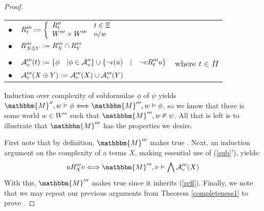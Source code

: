 \begin{proof}
  \begin{center}
    \begin{tabular}{lll}
      $\bullet$ & $R'''_t := \left\{ \begin{array}{ll}
        R''_t & t \in \Xi\\
        W''' \times W''' & o / w
      \end{array} \right.$ & \\
      $\bullet$ & $R'''_{X \oplus Y} := R'''_X \cap R'''_Y$ & \\
      &  & \\
      $\bullet$ & $\mathcal{A}'''_v (t) := \{\phi \hspace{1em} | \phi \in
      \mathcal{A}''_v \} \cup \{\neg \iota (u) \hspace{1em} | \hspace{1em}
      \neg v R'''_t u\}$ & where $t \in \Pi$\\
      $\bullet$ & $\mathcal{A}'''_v (X \oplus Y) := \mathcal{A}'''_v (X)
      \cup \mathcal{A}'''_v (Y)$ & 
    \end{tabular}
  \end{center}
  
  
  
  
  
  Induction over complexity of subformulae $\phi$ of $\psi$ yields
  $\mathbbm{M}'', w \vDash \phi \Longleftrightarrow \mathbbm{M}''', w \vDash
  \phi$, so we know that there is some world $w \in W'''$ such that
  $\mathbbm{M}''', w \nvDash \psi$.  All that is left is to illustrate that
  $\mathbbm{M}'''$ has the properties we desire.
  
  
  
  First note that by definition, $\mathbbm{M}'''$ makes true
  .  Next, an induction argument on the complexity of a
  terms $X$, making essential use of (\ref{sub}$'$), yields:
  \[ u R_X''' v \Longleftrightarrow \mathbbm{M}''', v \vDash \bigwedge
     \mathcal{A}'''_v (X) \]
  With this, $\mathbbm{M}'''$ makes true  since it inherits
  (\ref{refl}).  Finally, we note that we may repeat our previous arguments
  from Theorem \ref{completeness1} to prove .
\end{proof}
